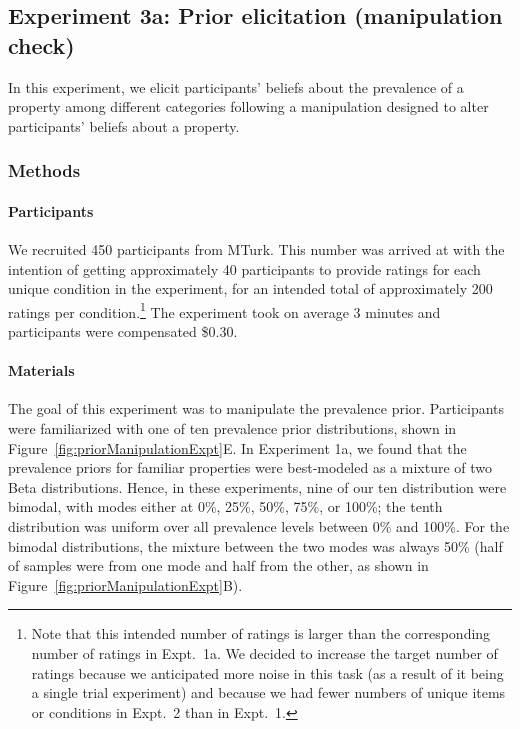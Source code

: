 \documentclass[floatsintext,doc]{apa6}
\let\oldparagraph\paragraph
\renewcommand{\paragraph}[1]{\oldparagraph{#1}\mbox{}}
\let\rmarkdownfootnote\footnote%
\def\footnote{\protect\rmarkdownfootnote}
\begin{document}
\hypertarget{experiment-3a-prior-elicitation-manipulation-check}{%
\subsection{Experiment 3a: Prior elicitation (manipulation check)}\label{experiment-3a-prior-elicitation-manipulation-check}}

In this experiment, we elicit participants' beliefs about the prevalence of a property among different categories following a manipulation designed to alter participants' beliefs about a property.


\hypertarget{methods-2}{%
\subsubsection{Methods}\label{methods-2}}

\hypertarget{participants-3}{%
\paragraph{Participants}\label{participants-3}}
%
We recruited 450 participants from MTurk.
This number was arrived at with the intention of getting approximately 40 participants to provide ratings for each unique condition in the experiment, for an intended total of approximately 200 ratings per condition.\footnote{Note that this intended number of ratings is larger than the corresponding number of ratings in Expt.~1a. We decided to increase the target number of ratings because we anticipated more noise in this task (as a result of it being a single trial experiment) and because we had fewer numbers of unique items or conditions in Expt.~2 than in Expt.~1.}
The experiment took on average 3 minutes and participants were compensated \$0.30.

\hypertarget{materials-1}{%
\paragraph{Materials}\label{materials-1}}
%
The goal of this experiment was to manipulate the prevalence prior.
Participants were familiarized with one of ten prevalence prior distributions, shown in Figure~\ref{fig:priorManipulationExpt}E.
In Experiment 1a, we found that the prevalence priors for familiar properties were best-modeled as a mixture of two Beta distributions.
Hence, in these experiments, nine of our ten distribution were bimodal, with modes either at 0\%, 25\%, 50\%, 75\%, or 100\%; the tenth distribution was uniform over all prevalence levels between 0\% and 100\%.
For the bimodal distributions, the mixture between the two modes was always 50\% (half of samples were from one mode and half from the other, as shown in Figure~\ref{fig:priorManipulationExpt}B).
\end{document}
